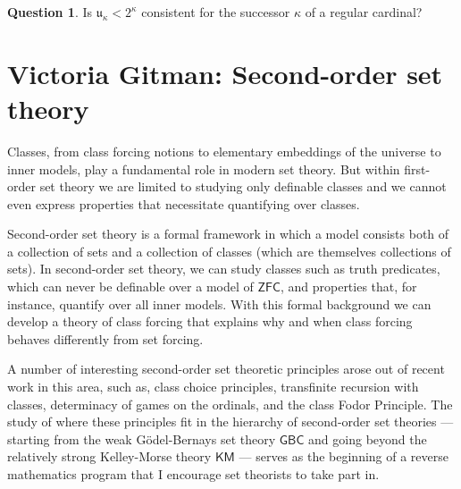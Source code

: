 \documentclass{amsart}
\theoremstyle{definition}
\newtheorem{question}[theorem]{Question}
\newcommand{\ZFC}{\mathsf{ZFC}}
\newcommand{\GBC}{\mathsf{GBC}}
\newcommand{\KM}{\mathsf{KM}}
\begin{document}

\begin{question} 
Is $\mathfrak{u}_\kappa<2^\kappa$ consistent for the successor $\kappa$ of a regular cardinal? 
\end{question} 







\iffalse 
\newpage 
\section{Victoria Gitman: Second-order set theory}

Classes, from class forcing notions to elementary embeddings of the universe to inner models, play a fundamental role in modern set theory. But within first-order set theory we are limited to studying only definable classes and we cannot even express properties that necessitate quantifying over classes. 

Second-order set theory is a formal framework in which a model consists both of a collection of sets and a collection of classes (which are themselves collections of sets). In second-order set theory, we can study classes such as truth predicates, which can never be definable over a model of $\ZFC$, and properties that, for instance, quantify over all inner models. With this formal background we can develop a theory of class forcing that explains why and when class forcing behaves differently from set forcing. 


A number of interesting second-order set theoretic principles arose out of recent work in this area, such as, class choice principles, transfinite recursion with classes, determinacy of games on the ordinals, and the class Fodor Principle. The study of where these principles fit in the hierarchy of second-order set theories --- starting from the weak G\"odel-Bernays set theory $\GBC$ and going beyond the relatively strong Kelley-Morse theory $\KM$ --- serves as the beginning of a reverse mathematics program that I encourage set theorists to take part in.
\end{document}
